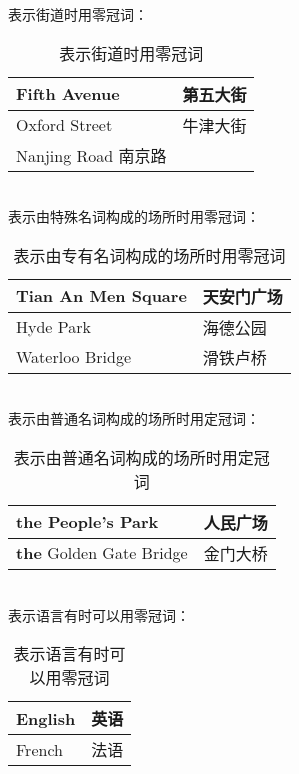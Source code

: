 \documentclass[UTF8]{ctexart}
\begin{document}
    表示街道时用零冠词：
    \begin{table}[h!]
        \begin{center}
            \ttfamily
            \begin{tabular}{p{180pt}|p{100pt}}
                \hline
                Fifth Avenue&第五大街\\ \hline
                Oxford Street&牛津大街\\ \hline
                Nanjing Road 南京路\\ \hline
            \end{tabular}
            \rmfamily
            \caption{表示街道时用零冠词}
        \end{center}
    \end{table}\\
    表示由特殊名词构成的场所时用零冠词：
    \begin{table}[h!]
        \begin{center}
            \ttfamily
            \begin{tabular}{p{180pt}|p{100pt}}
                \hline
                Tian An Men Square&天安门广场\\ \hline
                Hyde Park&海德公园\\ \hline
                Waterloo Bridge&滑铁卢桥\\ \hline
            \end{tabular}
            \rmfamily
            \caption{表示由专有名词构成的场所时用零冠词}
        \end{center}
    \end{table}\\
    表示由普通名词构成的场所时用定冠词：
    \begin{table}[h!]
        \begin{center}
            \ttfamily
            \begin{tabular}{p{180pt}|p{100pt}}
                \hline
                \textbf{the} People's Park&人民广场\\ \hline
                \textbf{the} Golden Gate Bridge&金门大桥\\ \hline
            \end{tabular}
            \rmfamily
            \caption{表示由普通名词构成的场所时用定冠词}
        \end{center}
    \end{table}\\
    表示语言有时可以用零冠词：
    \begin{table}[h!]
        \begin{center}
            \ttfamily
            \begin{tabular}{p{180pt}|p{100pt}}
                \hline
                English&英语\\ \hline
                French&法语\\ \hline
            \end{tabular}
            \rmfamily
            \caption{表示语言有时可以用零冠词}
        \end{center}
    \end{table}\\
\end{document}
